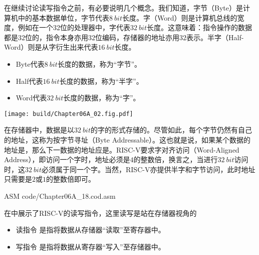 在继续讨论读写指令之前，有必要说明几个概念。我们知道，字节（Byte）是计算机中的基本数据单位，字节代表$\SI{8}{bit}$长度。字（Word）则是计算机总线的宽度，例如在一个32位的处理器中，字代表$\SI{32}{bit}$长度。这意味着：指令操作的数据都是$32$位的，指令本身亦用$32$位编码，存储器的地址亦用$32$表示。半字（Half-Word）则是从字衍生出来代表$\SI{16}{bit}$长度。

\begin{itemize}
    \item Byte代表$\SI{8}{bit}$长度的数据，称为“字节”。
    \item Half代表$\SI{16}{bit}$长度的数据，称为“半字”。
    \item Word代表$\SI{32}{bit}$长度的数据，称为“字”。
\end{itemize}

\begin{Figure}[存储器读写示意]
    \texttt{[image: build/Chapter06A\_02.fig.pdf]}
\end{Figure}

在存储器中，数据是以$\SI{32}{bit}$的字的形式存储的。尽管如此，每个字节仍然有自己的地址，这称为按字节寻址（Byte Addressable）。这也就是说，如果某个数据的地址是，那么下一数据的地址应是。RISC-V要求字对齐访问（Word-Aligned Address），即访问一个字时，地址必须是$4$的整数倍，换言之，当进行$\SI{32}{bit}$访问时，这$\SI{32}{bit}$必须属于同一个字。当然，RISC-V亦提供半字和字节访问，此时地址只需要是$2$或$1$的整数倍即可。

\begin{Code}{ASM}
    code/Chapter06A_18.cod.asm
\end{Code}

在中展示了RISC-V的读写指令，这里读写是站在存储器视角的
\begin{itemize}
    \item 读指令 是指将数据从存储器“读取”至寄存器中。
    \item 写指令 是指将数据从寄存器“写入”至存储器中。
\end{itemize}

